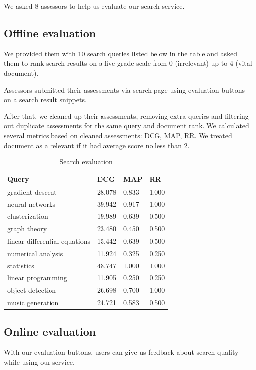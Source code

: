 We asked 8 assessors to help us evaluate our search service. 

\subsection{Offline evaluation}
We provided them with 10 search queries listed below in the table and asked them to rank search results on a five-grade scale from 0 (irrelevant) up to 4 (vital document).

Assessors submitted their assessments via search page using evaluation buttons on a search result snippets.

After that, we cleaned up their assessments, removing extra queries and filtering out duplicate assessments for the same query and document rank.
We calculated several metrics based on cleaned assessments: DCG, MAP, RR. We treated document as a relevant if it had average score no less than 2.

\begin{table}
    \centering 
    \begin{tabular}{| l | l | l | l |}
        \toprule
        Query & DCG & MAP & RR \\ 
        \midrule
        gradient descent & 28.078 & 0.833 & 1.000 \\  
        neural networks & 39.942 & 0.917 & 1.000 \\  
        clusterization & 19.989 & 0.639 & 0.500 \\  
        graph theory & 23.480 & 0.450 & 0.500 \\  
        linear differential equations & 15.442 & 0.639 & 0.500 \\  
        numerical analysis & 11.924 & 0.325 & 0.250 \\  
        statistics & 48.747 & 1.000 & 1.000 \\  
        linear programming & 11.905 & 0.250 & 0.250 \\  
        object detection & 26.698 & 0.700 & 1.000 \\  
        music generation & 24.721 & 0.583 & 0.500 \\  
        \bottomrule
    \end{tabular}
    \caption{Search evaluation}
\end{table}

\subsection{Online evaluation}
With our evaluation buttons, users can give us feedback about search quality while using our service.

